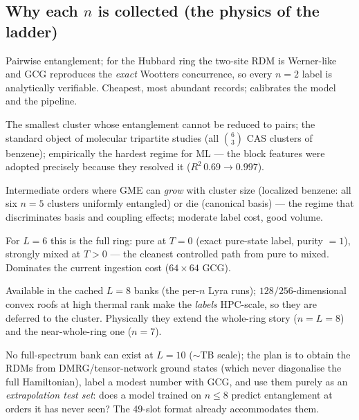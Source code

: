 \documentclass[11pt]{article}
\begin{document}
\subsection{Why each $n$ is collected (the physics of the ladder)}
\begin{description}[nosep]
  \item[$n=2$ --- the anchor.] Pairwise entanglement; for the Hubbard ring
        the two-site RDM is Werner-like and GCG reproduces the \emph{exact}
        Wootters concurrence, so every $n{=}2$ label is analytically
        verifiable. Cheapest, most abundant records; calibrates the model and
        the pipeline.
  \item[$n=3$ --- the first genuine multipartite order.] The smallest cluster
        whose entanglement cannot be reduced to pairs; the standard object of
        molecular tripartite studies (all $\binom{6}{3}$ CAS clusters of
        benzene); empirically the hardest regime for ML --- the block
        features were adopted precisely because they resolved it
        ($R^2\,0.69\to0.997$).
  \item[$n=4,5$ --- the interior of the ladder.] Intermediate orders where
        GME can \emph{grow} with cluster size (localized benzene: all six
        $n{=}5$ clusters uniformly entangled) or die (canonical basis) ---
        the regime that discriminates basis and coupling effects; moderate
        label cost, good volume.
  \item[$n=6$ --- whole-system physics at $L=6$.] For $L{=}6$ this is the
        full ring: pure at $T{=}0$ (exact pure-state label, purity $=1$),
        strongly mixed at $T{>}0$ --- the cleanest controlled path from pure
        to mixed. Dominates the current ingestion cost ($64\times64$ GCG).
  \item[$n=7,8$ --- the heavy orders ($L=8$).] Available in the cached $L=8$
        banks (the per-$n$ Lyra runs); $128/256$-dimensional convex roofs at
        high thermal rank make the \emph{labels} HPC-scale, so they are
        deferred to the cluster. Physically they extend the whole-ring story
        ($n{=}L{=}8$) and the near-whole-ring one ($n=7$).
  \item[$n=9,10$ --- beyond exact diagonalisation.] No full-spectrum bank can
        exist at $L=10$ ($\sim$TB scale); the plan is to obtain the RDMs from
        DMRG/tensor-network ground states (which never diagonalise the full
        Hamiltonian), label a modest number with GCG, and use them purely as
        an \emph{extrapolation test set}: does a model trained on $n\le8$
        predict entanglement at orders it has never seen? The 49-slot format
        already accommodates them.
\end{description}
\end{document}
